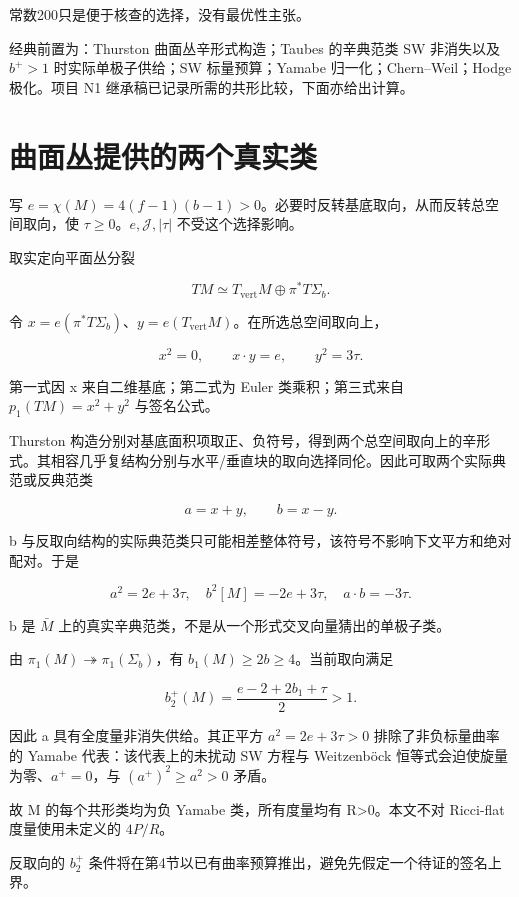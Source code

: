 \documentclass[UTF8,11pt,openany,fontset=none]{ctexbook}
\theoremstyle{definition}
\theoremstyle{remark}
\begin{document}
常数200只是便于核查的选择，没有最优性主张。

经典前置为：Thurston 曲面丛辛形式构造；Taubes 的辛典范类 SW 非消失以及 \(b^+>1\) 时实际单极子供给；SW 标量预算；Yamabe 归一化；Chern--Weil；Hodge 极化。项目 N1 继承稿已记录所需的共形比较，下面亦给出计算。

\section{曲面丛提供的两个真实类}\label{v6-ux66f2ux9762ux4e1bux63d0ux4f9bux7684ux4e24ux4e2aux771fux5b9eux7c7b}

写 \(e=\chi(M)=4(f-1)(b-1)>0\)。必要时反转基底取向，从而反转总空间取向，使 \(\tau\ge0\)。\(e,\mathcal J,|\tau|\) 不受这个选择影响。

取实定向平面丛分裂

\[
TM\simeq T_{\mathrm{vert}}M\oplus\pi^*T\Sigma_b.
\]

令 \(x=e(\pi^*T\Sigma_b)\)、\(y=e(T_{\mathrm{vert}}M)\)。在所选总空间取向上，

\[
x^2=0,\qquad x\cdot y=e,\qquad y^2=3\tau.
\tag{6.2.1}
\]

第一式因 x 来自二维基底；第二式为 Euler 类乘积；第三式来自 \(p_1(TM)=x^2+y^2\) 与签名公式。

Thurston 构造分别对基底面积项取正、负符号，得到两个总空间取向上的辛形式。其相容几乎复结构分别与水平/垂直块的取向选择同伦。因此可取两个实际典范或反典范类

\[
a=x+y,\qquad b=x-y.
\]

b 与反取向结构的实际典范类只可能相差整体符号，该符号不影响下文平方和绝对配对。于是

\[
\boxed{
 a^2=2e+3\tau,\quad b^2[M]=-2e+3\tau,
 \quad a\cdot b=-3\tau.
}
\tag{6.2.2}
\]

b 是 \(\bar M\) 上的真实辛典范类，不是从一个形式交叉向量猜出的单极子类。

由 \(\pi_1(M)\twoheadrightarrow\pi_1(\Sigma_b)\)，有 \(b_1(M)\ge2b\ge4\)。当前取向满足

\[
b_2^+(M)=\frac{e-2+2b_1+\tau}{2}>1.
\]

因此 a 具有全度量非消失供给。其正平方 \(a^2=2e+3\tau>0\) 排除了非负标量曲率的 Yamabe 代表：该代表上的未扰动 SW 方程与 Weitzenböck 恒等式会迫使旋量为零、\(a^+=0\)，与 \((a^+)^2\ge a^2>0\) 矛盾。

故 M 的每个共形类均为负 Yamabe 类，所有度量均有 R\textgreater0。本文不对 Ricci-flat 度量使用未定义的 \(4P/R\)。

反取向的 \(b_2^+\) 条件将在第4节以已有曲率预算推出，避免先假定一个待证的签名上界。
\end{document}

